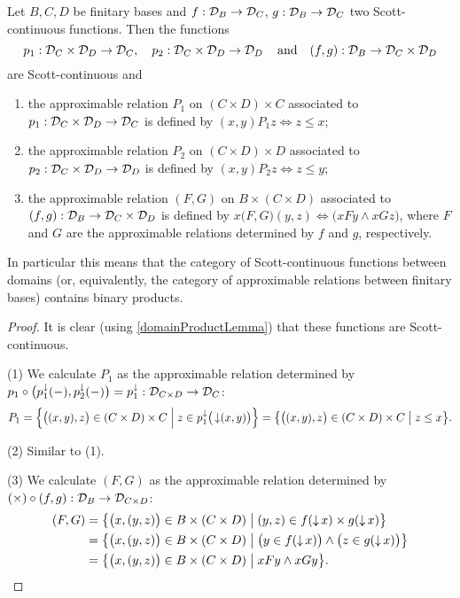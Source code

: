 \begin{proposition} \label{productApproximableRelations}
Let $B,C,D$ be finitary bases and $f: \mathcal{D}_B\to \mathcal{D}_C$, $g: \mathcal{D}_B\to \mathcal{D}_C$ two Scott-continuous functions. Then the functions
\[ p_1: \mathcal{D}_C\times \mathcal{D}_D \to \mathcal{D}_C, \quad p_2: \mathcal{D}_C\times \mathcal{D}_D \to \mathcal{D}_D\,\quad\text{and}\quad (f,g): \mathcal{D}_B \to \mathcal{D}_C\times \mathcal{D}_D \]
are Scott-continuous and
\begin{enumerate}
\item the approximable relation $P_1$ on $(C\times D)\times C$ associated to $p_1: \mathcal{D}_C\times \mathcal{D}_D \to \mathcal{D}_C$ is defined by $(x,y)P_1 z \iff z\leq x$;
\item the approximable relation $P_2$ on $(C\times D)\times D$ associated to $p_2: \mathcal{D}_C\times \mathcal{D}_D \to \mathcal{D}_D$ is defined by $(x,y)P_2 z \iff z\leq y$;
\item the approximable relation $(F,G)$ on $B\times (C\times D)$ associated to $(f,g): \mathcal{D}_B \to \mathcal{D}_C\times \mathcal{D}_D$ is defined by $x \big(F,G\big) (y,z) \iff \big(xFy \land xGz\big)$, where $F$ and $G$ are the approximable relations determined by $f$ and $g$, respectively.
\end{enumerate}
\end{proposition}
In particular this means that the category of Scott-continuous functions between domains (or, equivalently, the category of approximable relations between finitary bases) contains binary products.
\begin{proof}
It is clear (using \ref{domainProductLemma}) that these functions are Scott-continuous.

(1) We calculate $P_1$ as the approximable relation determined by $p_1 \circ \big(p_1^\downarrow(-), p_2^\downarrow(-)\big) = p_1^\downarrow: \mathcal{D}_{C\times D}\to \mathcal{D}_C$:
\[ P_1 = \setbuilder{\big((x,y),z\big)\in (C\times D)\times C}{z\in p_1^\imf\big(\downset (x,y)\big)} = \setbuilder{\big((x,y),z\big)\in (C\times D)\times C}{z\leq x}. \]

(2) Similar to (1).

(3) We calculate $(F,G)$ as the approximable relation determined by $(\times)\circ (f,g): \mathcal{D}_B\to \mathcal{D}_{C\times D}$:
\begin{align*}
(F,G) &= \setbuilder{\big(x,(y,z)\big)\in B\times (C\times D)}{(y,z) \in f(\downset x)\times g(\downset x)} \\
&= \setbuilder{\big(x,(y,z)\big)\in B\times (C\times D)}{\big(y \in f(\downset x)\big)\land\big(z\in g(\downset x)\big)} \\
&= \setbuilder{\big(x,(y,z)\big)\in B\times (C\times D)}{xFy\land xGy}.
\end{align*}
\end{proof}

